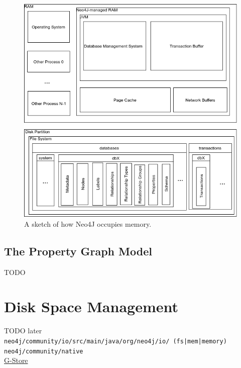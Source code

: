 \documentclass[a4paper,10pt]{article}
\begin{document}
        \begin{figure}[htp]\label{N4J_memory_view}
        \begin{center}
        \includegraphics[keepaspectratio,width=\textwidth]{img/00_intro/N4J_memory_view.png}
        \end{center}
        \caption{A sketch of how Neo4J occupies memory.} %
        \end{figure}

    \subsection{The Property Graph Model}
        TODO

\newpage


\section{Disk Space Management}
    TODO later \\
    \texttt{neo4j/community/io/src/main/java/org/neo4j/io/ (fs|mem|memory)} \\
    \texttt{neo4j/community/native} \\
    \href{http://g-store.sourceforge.net/th/index.htm}{G-Store} \\
\end{document}
